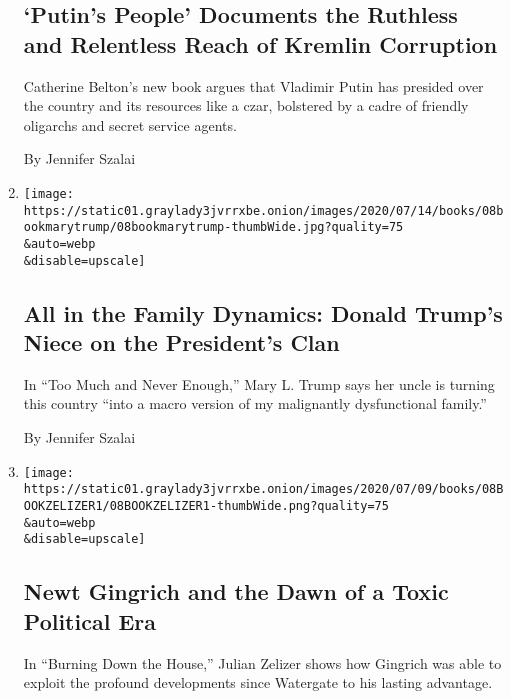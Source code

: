 \begin{enumerate}
  \hypertarget{putins-people-documents-the-ruthless-and-relentless-reach-of-kremlin-corruption}{%
  \subsection{`Putin's People' Documents the Ruthless and Relentless
  Reach of Kremlin
  Corruption}\label{putins-people-documents-the-ruthless-and-relentless-reach-of-kremlin-corruption}}

  Catherine Belton's new book argues that Vladimir Putin has presided
  over the country and its resources like a czar, bolstered by a cadre
  of friendly oligarchs and secret service agents.

  By Jennifer Szalai
\item
  \href{/2020/07/08/books/review-too-much-never-enough-mary-trump.html}{}

  \texttt{[image: https://static01.graylady3jvrrxbe.onion/images/2020/07/14/books/08bookmarytrump/08bookmarytrump-thumbWide.jpg?quality=75\\\&auto=webp\\\&disable=upscale]}

  \hypertarget{all-in-the-family-dynamics-donald-trumps-niece-on-the-presidents-clan}{%
  \subsection{All in the Family Dynamics: Donald Trump's Niece on the
  President's
  Clan}\label{all-in-the-family-dynamics-donald-trumps-niece-on-the-presidents-clan}}

  In ``Too Much and Never Enough,'' Mary L. Trump says her uncle is
  turning this country ``into a macro version of my malignantly
  dysfunctional family.''

  By Jennifer Szalai
\item
  \href{/2020/07/04/books/review-burning-down-house-newt-gingrich-julian-zelizer.html}{}

  \texttt{[image: https://static01.graylady3jvrrxbe.onion/images/2020/07/09/books/08BOOKZELIZER1/08BOOKZELIZER1-thumbWide.png?quality=75\\\&auto=webp\\\&disable=upscale]}

  \hypertarget{newt-gingrich-and-the-dawn-of-a-toxic-political-era}{%
  \subsection{Newt Gingrich and the Dawn of a Toxic Political
  Era}\label{newt-gingrich-and-the-dawn-of-a-toxic-political-era}}

  In ``Burning Down the House,'' Julian Zelizer shows how Gingrich was
  able to exploit the profound developments since Watergate to his
  lasting advantage.


\end{enumerate}

